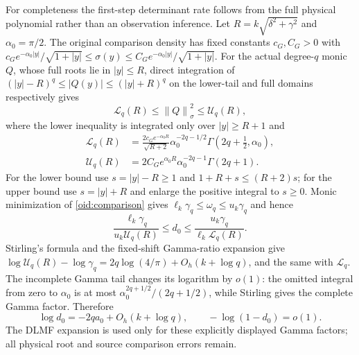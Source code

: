 \documentclass[11pt,a4paper]{article}
\newcommand{\norm}[1]{\left\lVert#1\right\rVert}
\begin{document}
For completeness the first-step determinant rate follows from the
full physical polynomial rather than an observation inference.
Let $R=k\sqrt{\delta^2+\gamma^2}$ and $\alpha_0=\pi/2$.
The original comparison density has fixed constants $c_G,C_G>0$
with
$c_Ge^{-\alpha_0|y|}/\sqrt{1+|y|}\le\sigma(y)
\le C_Ge^{-\alpha_0|y|}/\sqrt{1+|y|}$.
For the actual degree-$q$ monic $Q$, whose full roots lie in
$|y|\le R$, direct integration of
$(|y|-R)^q\le |Q(y)|\le(|y|+R)^q$ on the lower-tail and full
domains respectively gives
\[
 \mathscr L_q(R)\le\norm Q_\sigma^2\le\mathscr U_q(R),
\]
where the lower inequality is integrated only over $|y|\ge R+1$ and
\begin{align*}
 \mathscr L_q(R)&=\frac{2c_Ge^{-\alpha_0R}}{\sqrt{R+2}}
 \alpha_0^{-2q-1/2}\Gamma(2q+\tfrac12,\alpha_0),\\
 \mathscr U_q(R)&=2C_Ge^{\alpha_0R}
 \alpha_0^{-2q-1}\Gamma(2q+1).
\end{align*}
For the lower bound use $s=|y|-R\ge1$ and
$1+R+s\le(R+2)s$; for the upper bound use $s=|y|+R$ and
enlarge the positive integral to $s\ge0$. Monic minimization of
\eqref{oid:comparison} gives
$\ell_k\gamma_q\le\omega_q\le u_k\gamma_q$ and hence
\begin{equation}\label{oid:finited0}
 \frac{\ell_k\gamma_q}{u_k\mathscr U_q(R)}
 \le d_0\le
 \frac{u_k\gamma_q}{\ell_k\mathscr L_q(R)}.
\end{equation}
Stirling's formula and the fixed-shift Gamma-ratio expansion
\cite[\S5.11(i), (iii)]{DLMF5} give
$\log\mathscr U_q(R)-\log\gamma_q
=2q\log(4/\pi)+O_h(k+\log q)$, and the same with
$\mathscr L_q$. The incomplete Gamma tail changes its logarithm
by $o(1)$: the omitted integral from zero to $\alpha_0$ is at most
$\alpha_0^{2q+1/2}/(2q+1/2)$, while Stirling gives the complete
Gamma factor. Therefore
\begin{equation}\label{oid:d0rate}
 \log d_0=-2qa_0+O_h(k+\log q),\qquad
 -\log(1-d_0)=o(1).
\end{equation}
The DLMF expansion is used only for these explicitly displayed
Gamma factors; all physical root and source comparison errors remain.
\end{document}
